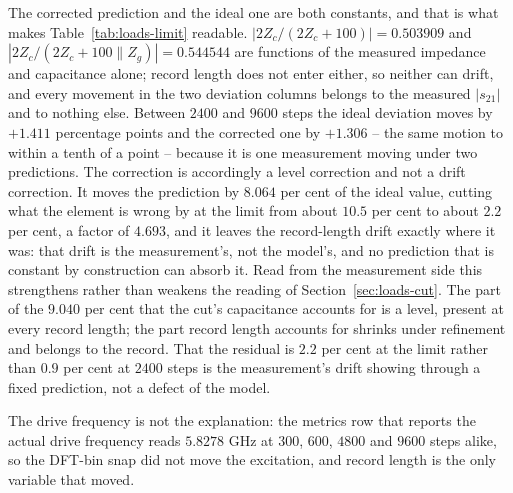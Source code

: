 The corrected prediction and the ideal one are both constants, and that is what makes
Table~\ref{tab:loads-limit} readable. $|2Z_c/(2Z_c + 100)| = 0.503909$ and
$|2Z_c/(2Z_c + 100 \parallel Z_g)| = 0.544544$ are functions of the measured impedance and capacitance alone;
record length does not enter either, so neither can drift, and every movement in the two deviation columns
belongs to the measured $|s_{21}|$ and to nothing else. Between $2400$ and $9600$ steps the ideal deviation
moves by $+1.411$ percentage points and the corrected one by $+1.306$ -- the same motion to within a tenth of a
point -- because it is one measurement moving under two predictions. The correction is accordingly a level
correction and not a drift correction. It moves the prediction by $8.064$ per cent of the ideal value, cutting
what the element is wrong by at the limit from about $10.5$ per cent to about $2.2$ per cent, a factor of
$4.693$, and it leaves the record-length drift exactly where it was: that drift is the measurement's, not the
model's, and no prediction that is constant by construction can absorb it. Read from the measurement side this
strengthens rather than weakens the reading of Section~\ref{sec:loads-cut}. The part of the $9.040$ per cent
that the cut's capacitance accounts for is a level, present at every record length; the part record length
accounts for shrinks under refinement and belongs to the record. That the residual is $2.2$ per cent at the
limit rather than $0.9$ per cent at $2400$ steps is the measurement's drift showing through a fixed prediction,
not a defect of the model.

The drive frequency is not the explanation: the metrics row that reports the actual drive frequency reads
$5.8278$ GHz at $300$, $600$, $4800$ and $9600$ steps alike, so the DFT-bin snap did not move the excitation, and
record length is the only variable that moved.

